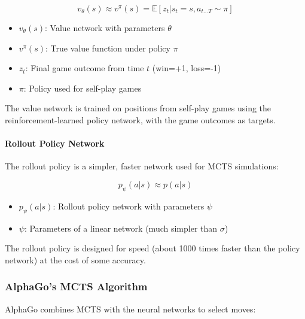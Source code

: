 \documentclass[11pt]{article}
\begin{document}
\begin{equation}
    v_\theta(s) \approx v^\pi(s) = \mathbb{E}[z_t | s_t = s, a_{t...T} \sim \pi]
\end{equation}

\begin{tcolorbox}[title=Notation Overview]
\begin{itemize}
    \item $v_\theta(s)$: Value network with parameters $\theta$
    \item $v^\pi(s)$: True value function under policy $\pi$
    \item $z_t$: Final game outcome from time $t$ (win=+1, loss=-1)
    \item $\pi$: Policy used for self-play games
\end{itemize}
\end{tcolorbox}

The value network is trained on positions from self-play games using the reinforcement-learned policy network, with the game outcomes as targets.

\paragraph{Rollout Policy Network}
The rollout policy is a simpler, faster network used for MCTS simulations:

\begin{equation}
    p_\psi(a|s) \approx p(a|s)
\end{equation}

\begin{tcolorbox}[title=Notation Overview]
\begin{itemize}
    \item $p_\psi(a|s)$: Rollout policy network with parameters $\psi$
    \item $\psi$: Parameters of a linear network (much simpler than $\sigma$)
\end{itemize}
\end{tcolorbox}

The rollout policy is designed for speed (about 1000 times faster than the policy network) at the cost of some accuracy.

\subsubsection{AlphaGo's MCTS Algorithm}

AlphaGo combines MCTS with the neural networks to select moves:
\end{document}
